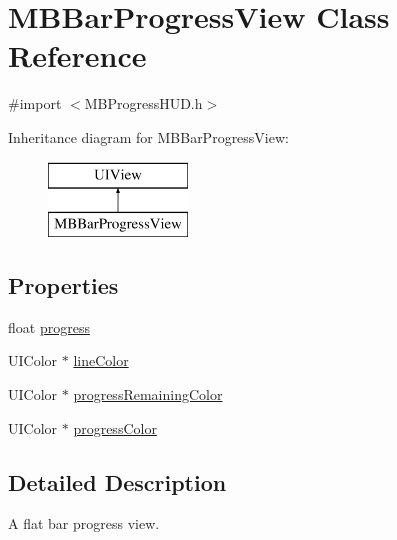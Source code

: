 \hypertarget{interface_m_b_bar_progress_view}{\section{M\+B\+Bar\+Progress\+View Class Reference}
\label{interface_m_b_bar_progress_view}
}


{\ttfamily \#import $<$M\+B\+Progress\+H\+U\+D.\+h$>$}

Inheritance diagram for M\+B\+Bar\+Progress\+View\+:\begin{figure}[H]
\begin{center}
\leavevmode
\includegraphics[height=2.000000cm]{interface_m_b_bar_progress_view}
\end{center}
\end{figure}
\subsection*{Properties}
\begin{DoxyCompactItemize}
\item 
float \hyperlink{interface_m_b_bar_progress_view_aa34865ca266850eb7060e91309f3512b}{progress}
\item 
U\+I\+Color $\ast$ \hyperlink{interface_m_b_bar_progress_view_a594029fb5ed62f3de81902c0ea815f2f}{line\+Color}
\item 
U\+I\+Color $\ast$ \hyperlink{interface_m_b_bar_progress_view_a0529e715ce6e40bf0e09864ba0ca1219}{progress\+Remaining\+Color}
\item 
U\+I\+Color $\ast$ \hyperlink{interface_m_b_bar_progress_view_a5b27bb23bd54ae1c7b37a3fedd817e80}{progress\+Color}
\end{DoxyCompactItemize}


\subsection{Detailed Description}
A flat bar progress view. 

